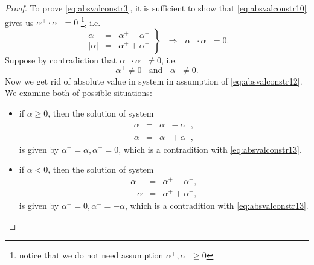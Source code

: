 \begin{proof}
\noindent To prove \eqref{eq:absvalconstr3}, it is sufficient to show that \eqref{eq:absvalconstr10} gives us $\alpha^{+} \cdot \alpha^{-} = 0$
\footnote{notice that we do not need assumption $\alpha^{+},\alpha^{-} \geq 0$}, 
i.e.
\begin{equation}
 \label{eq:absvalconstr12}
 \left.
 \begin{array}{rcl}
  \alpha & = & \alpha^{+} - \alpha^{-} \\
  \vert \alpha \vert & = & \alpha^{+} + \alpha^{-}
 \end{array}
 \right\rbrace ~~~ \Rightarrow
 ~~~ \alpha^{+} \cdot \alpha^{-} = 0.
\end{equation}
Suppose by contradiction that $\alpha^{+} \cdot \alpha^{-} \neq 0$, i.e.
\begin{equation}
 \label{eq:absvalconstr13}
 \alpha^{+} \neq 0 ~~~~ \textrm{and} ~~~~ \alpha^{-} \neq 0.
\end{equation}
Now we get rid of absolute value in system in assumption of \eqref{eq:absvalconstr12}.
We examine both of possible situations:
\begin{itemize}
 \item if $\alpha \geq 0$, then the solution of system
  \begin{displaymath}
   \begin{array}{rcl}
    \alpha & = & \alpha^{+} - \alpha^{-}, \\
    \alpha& = & \alpha^{+} + \alpha^{-}, 
   \end{array}
  \end{displaymath}
  is given by $\alpha^{+} = \alpha, \alpha^{-} = 0$, which is a contradition with \eqref{eq:absvalconstr13}.
 \item if $\alpha < 0$, then the solution of system
  \begin{displaymath}
   \begin{array}{rcl}
    \alpha & = & \alpha^{+} - \alpha^{-}, \\
    -\alpha& = & \alpha^{+} + \alpha^{-}, 
   \end{array}
  \end{displaymath}
  is given by $\alpha^{+} = 0, \alpha^{-} = -\alpha$, which is a contradition with \eqref{eq:absvalconstr13}.
\end{itemize}



\end{proof}
